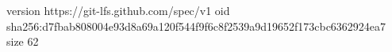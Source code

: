 version https://git-lfs.github.com/spec/v1
oid sha256:d7fbab808004e93d8a69a120f544f9f6c8f2539a9d19652f173cbc6362924ea7
size 62
